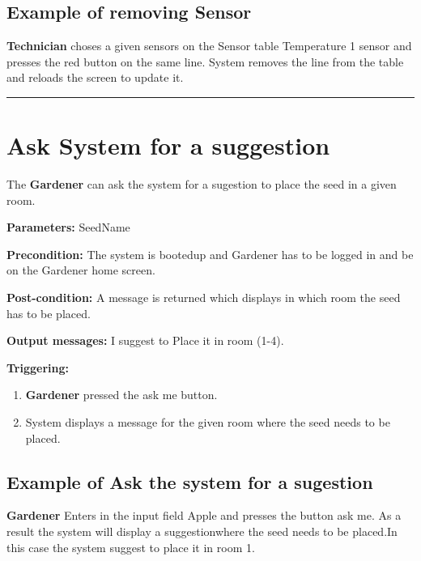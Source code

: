 \subsection{Example of removing Sensor}
\textbf{Technician} choses a given sensors on the Sensor table Temperature 1
sensor and presses the red button on the same line.
System removes the line from the table and reloads the screen to update it.

 \hfill
\vspace{0.5cm}
\hrule






\section{Ask System for a suggestion}

\label{operation:AskSystemForASuggestion}

The \textbf{Gardener} can ask the system for a sugestion to place the seed in a
given room.
\begin{description} 

\item \textbf{Parameters:} SeedName
\item \textbf{Precondition:} The system is bootedup and Gardener has to be
logged in and be on the Gardener home screen.
\item \textbf{Post-condition:} A message is returned which displays in which
room the seed has to be placed.
\item \textbf{Output messages:} I suggest to Place it in room (1-4).
\item \textbf{Triggering:}
\begin{enumerate}
\item \textbf{Gardener} pressed the ask me button.
\item System displays a message for the given room where the seed needs to be
placed.
\end{enumerate}
\end{description}

\subsection{Example of Ask the system for a sugestion}
\textbf{Gardener} Enters in the input field Apple and presses the button ask me.
As a result the system will display a suggestionwhere the seed needs to be
placed.In this case the system suggest to place it in room 1.

